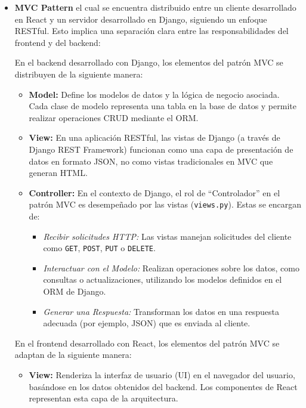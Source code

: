 \documentclass{report}
\begin{document}
\begin{itemize}
        \item \textbf{MVC Pattern} el cual se encuentra distribuido entre un cliente desarrollado en React y un servidor desarrollado en Django, siguiendo un enfoque RESTful. Esto implica una separación clara entre las responsabilidades del frontend y del backend:

        En el backend desarrollado con Django, los elementos del patrón MVC se distribuyen de la siguiente manera:

        \begin{itemize}
            \item \textbf{Model:} Define los modelos de datos y la lógica de negocio asociada. Cada clase de modelo representa una tabla en la base de datos y permite realizar operaciones CRUD mediante el ORM.
            
            \item \textbf{View:} En una aplicación RESTful, las vistas de Django (a través de Django REST Framework) funcionan como una capa de presentación de datos en formato JSON, no como vistas tradicionales en MVC que generan HTML.

            \item \textbf{Controller:} En el contexto de Django, el rol de ``Controlador'' en el patrón MVC es desempeñado por las vistas (\texttt{views.py}). Estas se encargan de:
                \begin{itemize}
                    \item \textit{Recibir solicitudes HTTP:} Las vistas manejan solicitudes del cliente como \texttt{GET}, \texttt{POST}, \texttt{PUT} o \texttt{DELETE}.
                    \item \textit{Interactuar con el Modelo:} Realizan operaciones sobre los datos, como consultas o actualizaciones, utilizando los modelos definidos en el ORM de Django.
                    \item \textit{Generar una Respuesta:} Transforman los datos en una respuesta adecuada (por ejemplo, JSON) que es enviada al cliente.
                \end{itemize}
        \end{itemize}

        En el frontend desarrollado con React, los elementos del patrón MVC se adaptan de la siguiente manera:

        \begin{itemize}
            \item \textbf{View:} Renderiza la interfaz de usuario (UI) en el navegador del usuario, basándose en los datos obtenidos del backend. Los componentes de React representan esta capa de la arquitectura.


\end{itemize}
\end{itemize}
\end{document}
